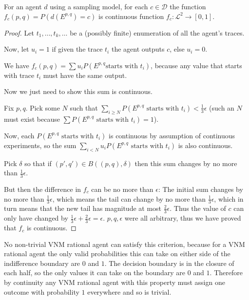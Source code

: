 \begin{theorem}
For an agent $d$
using a sampling model, for each $c \in \mathcal{D}$
the function $f_c(p, q) = P(d(E^{p, q}) = c)$
is continuous function $f_c: \mathcal{L}^2 \to [0, 1]$.
\end{theorem}

\begin{proof}
Let $t_1, \ldots, t_k, \ldots$
be a (possibly finite) enumeration of all the agent's traces.

Now, let $u_i = 1$ if given the trace $t_i$ the agent outputs $c$, else $u_i = 0$.

We have $f_c(p, q) = \sum u_iP(E^{p, q} \text{starts with $t_i$})$, because any value that starts with trace $t_i$ must have the same output.

Now we just need to show this sum is continuous.

Fix $p, q$.
Pick some $N$ such that $\sum\limits_{i \geq N} P(E^{p, q} \text{ starts with } t_i) < \frac{1}{3}\epsilon$
(such an $N$
must exist because $\sum P(E^{p, q} \text{ starts with } t_i) = 1$).

Now, each $P(E^{p, q} \text{ starts with } t_i)$
is continuous by assumption of continuous experiments, so the sum
$\sum\limits_{i < N} u_i P(E^{p, q} \text{ starts with } t_i)$
is also continuous.

Pick $\delta$
so that if $(p', q') \in B((p, q), \delta)$
then this sum changes by no more than $\frac{1}{3}\epsilon$.

But then the difference in $f_c$ can be no more than $\epsilon$:
The initial sum changes by no more than $\frac{1}{3}\epsilon$,
which means the tail can change by no more than $\frac{1}{3}\epsilon$,
which in turn means that the new tail has magnitude at most $\frac{2}{3}\epsilon$.
Thus the value of $c$ can only have changed by
$\frac{1}{3}\epsilon + \frac{2}{3}\epsilon = \epsilon$.
$p, q, \epsilon$
were all arbitrary, thus we have proved that $f_c$ is continuous.
\end{proof}

No non-trivial VNM rational agent can satisfy this criterion, because
for a VNM rational agent the only valid probabilities this can take on either
side of the indifference boundary are $0$ and $1$. The decision boundary is in the
closure of each half, so the only values it can take on the boundary are $0$
and $1$. Therefore by continuity any VNM rational agent with this property must
assign one outcome with probability $1$ everywhere and so is trivial.

